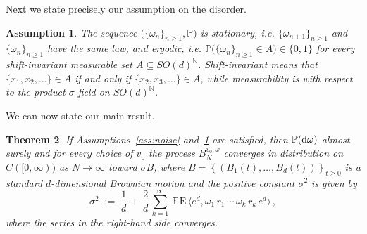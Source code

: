 \documentclass[a4paper,reqno,11pt]{amsart}
\numberwithin{equation}{section}
\newtheorem{theorem}{Theorem}[section]
\newtheorem{assumption}[theorem]{Assumption}
\newcommand{\bbE}{{\ensuremath{\mathbb E}} }
\newcommand{\bbP}{{\ensuremath{\mathbb P}} }
\newcommand{\gs}{\sigma}
\newcommand{\go}{\omega}
\newcommand{\dd}{\text{\rm d}}             %
\newcommand{\N}{\mathbb{N}}
\def\bE{\ensuremath{\bs{\mathrm{E}}}}
\def\bs{\boldsymbol}
\begin{document}
\smallskip

Next we state precisely our assumption on the disorder.  

\medskip
\begin{assumption} \rm \label{ass:disorder}
The sequence $\big(\{\go_n\}_{n\ge 1},\bbP\big)$ is {\sl stationary},
{\sl i.e.} $\{\go_{n+1}\}_{n\ge 1} $ and $ \{\go_n\}_{n\ge 1}$ have the same 
law, and {\sl ergodic},
{\sl i.e.} $\bbP \big( \{\go_n\}_{n\ge 1} \in A \big) \in \{0,1\}$
for every shift-invariant measurable set $A \subseteq SO(d)^{\N}$.
Shift-invariant means that $\{x_1, x_2, \ldots\} \in A$
if and only if $\{x_2, x_3, \ldots\} \in A$, while measurability is with respect to the
product $\gs$-field on $SO(d)^{\N}$.
\end{assumption}
\medskip

We can now state our main result.

\medskip
\begin{theorem} \label{th:main}
If Assumptions~\ref{ass:noise} and~\ref{ass:disorder} are satisfied,
then $\bbP(\dd \go)$-almost surely and for every choice of $v_0$ the
process $B_{N}^{v_0, \go}$ converges in distribution on $C([0,\infty))$
as $N \to\infty$ toward $\gs B$, where 
$B=\left\{ \left(B_1(t), \ldots , B_d(t)\right) \right\}_{t\ge 0}$
is a standard $d$-dimensional Brownian motion and the positive
constant $\sigma^2$ is given by
\begin{equation}
\label{eq:sigma-def}
	\sigma^2 \;:=\; \frac 1 d \,+\, \frac 2 d\, \sum_{k=1}^\infty \,
	\bbE  \, \bE \, \langle e^d ,
	 \go_1 \, r_1 \, \cdots \, \go_k \, r_k  \, e^d \rangle \,,
\end{equation}
where the series in the right-hand side  converges.
\end{theorem}

\medskip
\end{document}
